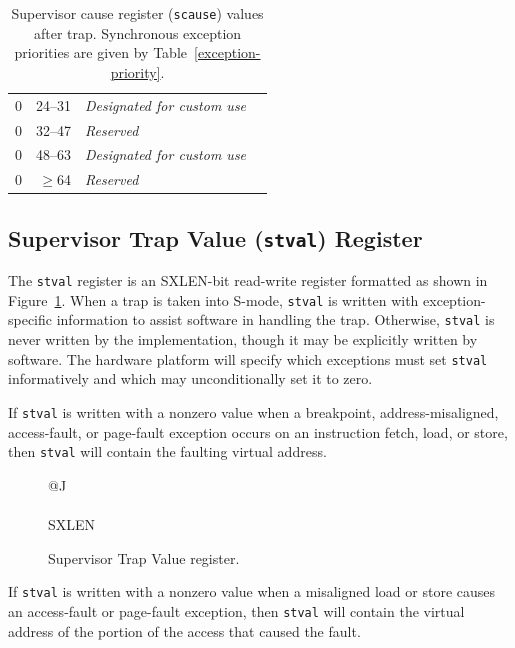 \begin{table}[h!]
\begin{center}
\begin{tabular}{|r|r|l|l|}
  0         & 24--31          & {\em Designated for custom use} \\
  0         & 32--47          & {\em Reserved} \\
  0         & 48--63          & {\em Designated for custom use} \\
  0         & $\ge$64         & {\em Reserved} \\
  \hline
\end{tabular}
\end{center}
\caption{Supervisor cause register ({\tt scause}) values after trap.
Synchronous exception priorities are given by Table~\ref{exception-priority}.}
\label{scauses}
\end{table}

\subsection{Supervisor Trap Value ({\tt stval}) Register}

The {\tt stval} register is an SXLEN-bit read-write register formatted as shown
in Figure~\ref{stvalreg}.  When a trap is taken into S-mode, {\tt stval} is
written with exception-specific information to assist software in handling the
trap.  Otherwise, {\tt stval} is never written by the implementation, though
it may be explicitly written by software.  The hardware platform will specify
which exceptions must set {\tt stval} informatively and which may
unconditionally set it to zero.


If {\tt stval} is written with a nonzero value when a breakpoint,
address-misaligned, access-fault, or page-fault exception occurs on an
instruction fetch, load, or store, then {\tt stval} will contain the faulting
virtual address.

\begin{figure}[h!]
{\footnotesize
\begin{center}
\begin{tabular}{@{}J}
 \\
\hline
{} \\
\hline
SXLEN \\
\end{tabular}
\end{center}
}
\vspace{-0.1in}
\caption{Supervisor Trap Value register.}
\label{stvalreg}
\end{figure}

If {\tt stval} is written with a nonzero value when a misaligned load or store
causes an access-fault or page-fault exception, then {\tt stval} will contain
the virtual address of the portion of the access that caused the fault.

